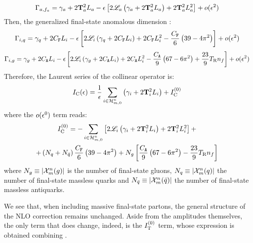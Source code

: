 \begin{equation}
  \Gamma_{a , f_a} = \gamma_a + 2 \mathbf{T}_a^2 L_a - \epsilon \left[ 2 \mathscr{L}_a \left( \gamma_a + 2 \mathbf{T}_a^2 L_a \right) + 2 \mathbf{T}_a^2 L_a^2 \right] + o(\epsilon^2)
\end{equation}
Then, the generalized final-state anomalous dimension :
\begin{equation}
  \Gamma_{i , q} = \gamma_q + 2 C_\mathtt{F} L_i - \epsilon \left[ 2 \mathscr{L}_i \left( \gamma_q + 2 C_\mathtt{F} L_i \right) + 2 C_\mathtt{F} L_i^2 - \frac{C_\mathtt{F}}{6} \left( 39 - 4\pi^2 \right) \right] + o(\epsilon^2)
\end{equation}
\begin{equation}
  \Gamma_{i , g} = \gamma_g + 2 C_\mathtt{A} L_i - \epsilon \left[ 2 \mathscr{L}_i \left( \gamma_g + 2 C_\mathtt{A} L_i \right) + 2 C_\mathtt{A} L_i^2 - \frac{C_\mathtt{A}}{9} \left( 67 - 6\pi^2 \right) + \frac{23}{9} T_\text{R} n_f \right] + o(\epsilon^2)
\end{equation}
Therefore, the Laurent series of the collinear operator is:
\begin{equation}
  I_\text{C}(\epsilon) = \frac{1}{\epsilon} \sum_{i \in \mathcal{H}^{n}_{m,0}} \left( \gamma_i + 2 \mathbf{T}_i^2 L_i \right) + I_\text{C}^{(0)}
\end{equation}
where the $ o(\epsilon^0) $ term reads:
\begin{multline}
  I_\text{C}^{(0)} = - \sum_{i \in \mathcal{H}^{n}_{m,0}} \left[ 2 \mathscr{L}_i \left( \gamma_i + 2 \mathbf{T}_i^2 L_i \right) + 2 \mathbf{T}_i^2 L_i^2 \right] + \\
  + \left( N_q + N_{\bar{q}} \right) \frac{C_\mathtt{F}}{6} \left( 39 - 4\pi^2 \right) + N_g \left[ \frac{C_\mathtt{A}}{9} \left( 67 - 6\pi^2 \right) - \frac{23}{9} T_\text{R} n_f \right]
  \label{eq:ico-zero}
\end{multline}
where $ N_g \equiv \left\lvert\mathcal{X}^{n}_{m}(g)\right\rvert $ is the number of final-state gluons, $ N_q \equiv \left\lvert\mathcal{X}^{n}_{m}(q)\right\rvert $ the number of final-state massless quarks and $ N_{\bar{q}} \equiv \left\lvert\mathcal{X}^{n}_{m}(\bar{q})\right\rvert $ the number of final-state massless antiquarks.

We see that, when including massive final-state partons, the general structure of the NLO correction  remains unchanged. Aside from the amplitudes themselves, the only term that does change, indeed, is the $ I_\text{T}^{(0)} $ term, whose expression is obtained combining .










